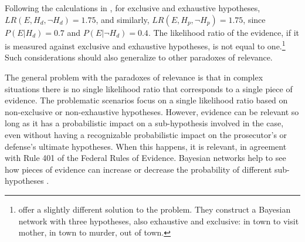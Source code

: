 \documentclass{article}
\begin{document}
\noindent
  Following the calculations in \citep{dezoete2019ResolvingSocalledProbabilistic}, for exclusive and exhaustive hypotheses, $LR(E,H_d,\neg H_d)=1.75$, and similarly, $LR(E,H_p, \neg H_p)=1.75$, since $P(E\vert H_d)=0.7$ and $P(E\vert \neg H_d)=0.4$. 
  The likelihood ratio of the evidence, if it is measured against exclusive and exhaustive hypotheses, is not equal to one.\footnote{ \cite{dezoete2019ResolvingSocalledProbabilistic} offer a slightly different solution to the problem. They construct a Bayesian network with three hypotheses, also exhaustive and exclusive: in town to visit mother, in town to murder, out of town.} 
Such considerations should also generalize to other paradoxes of relevance.  
%
%

The general problem with the  paradoxes of relevance is that in complex situations there is no single likelihood ratio that corresponds to a single piece of evidence. The problematic scenarios focus on a single likelihood ratio based on non-exclusive or non-exhaustive hypotheses.  However, evidence can be relevant so long as it has a probabilistic impact on a  sub-hypothesis involved in the case,  even without having a recognizable probabilistic impact on the prosecutor's or defense's ultimate hypotheses. When this happens, it is relevant, in agreement with Rule 401 of the Federal Rules of Evidence. Bayesian networks help to see how pieces of evidence can increase or decrease the probability of different sub-hypotheses  \cite{dezoete2019ResolvingSocalledProbabilistic}. 

\end{document}
